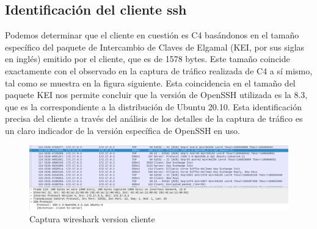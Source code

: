 \documentclass[letter,12pt]{article}
\begin{document}
\subsection{Identificación del cliente ssh}
Podemos determinar que el cliente en cuestión es C4 basándonos en el tamaño específico del paquete de Intercambio de Claves de Elgamal (KEI, por sus siglas en inglés) emitido por el cliente, que es de 1578 bytes. Este tamaño coincide exactamente con el observado en la captura de tráfico realizada de C4 a sí mismo, tal como se muestra en la figura siguiente. Esta coincidencia en el tamaño del paquete KEI nos permite concluir que la versión de OpenSSH utilizada es la 8.3, que es la correspondiente a la distribución de Ubuntu 20.10. Esta identificación precisa del cliente a través del análisis de los detalles de la captura de tráfico es un claro indicador de la versión específica de OpenSSH en uso.
\begin{figure}[H]
        \centering
        \includegraphics[width=1\textwidth]{img/captura_wire.png}  
        \caption{Captura wireshark version cliente}
    \end{figure}
\end{document}
